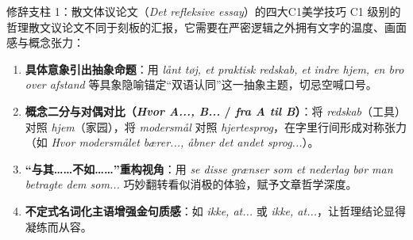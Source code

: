 \begin{grammatikbox}{修辞支柱 1：散文体议论文（\textit{Det refleksive essay}）的四大C1美学技巧}
C1 级别的哲理散文议论文不同于刻板的汇报，它需要在严密逻辑之外拥有文字的温度、画面感与概念张力：
\begin{enumerate}
  \item \textbf{具体意象引出抽象命题}：用 \textit{lånt tøj, et praktisk redskab, et indre hjem, en bro over afstand} 等具象隐喻锚定“双语认同”这一抽象主题，切忌空喊口号。
  \item \textbf{概念二分与对偶对比（\textit{Hvor A..., B...} / \textit{fra A til B}）}：将 \textit{redskab}（工具）对照 \textit{hjem}（家园），将 \textit{modersmål} 对照 \textit{hjertesprog}，在字里行间形成对称张力（如 \textit{Hvor modersmålet bærer..., åbner det andet sprog...}）。
  \item \textbf{“与其……不如……”重构视角}：用 \textit{ se disse grænser som et nederlag bør man betragte dem som...} 巧妙翻转看似消极的体验，赋予文章哲学深度。
  \item \textbf{不定式名词化主语增强金句质感}：如 \textit{ ikke, at...} 或 \textit{ ikke, at...}，让哲理结论显得凝练而从容。
\end{enumerate}
\end{grammatikbox}

